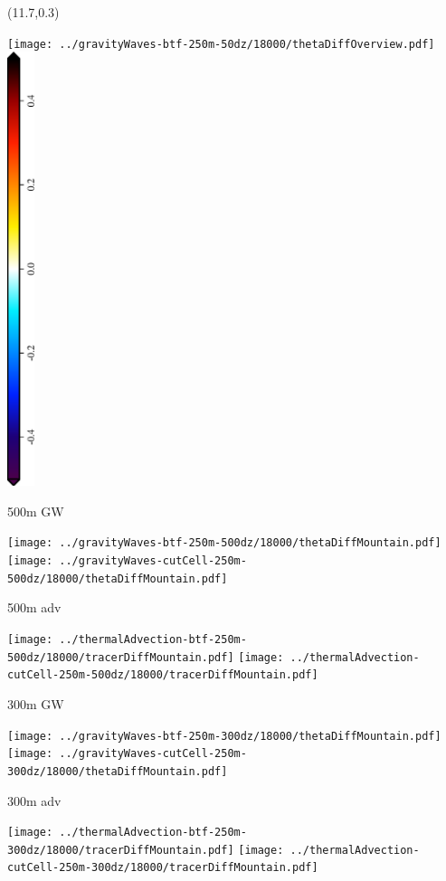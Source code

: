 \documentclass{article}
\begin{document}
\TPMargin{3pt}
\begin{textblock}{0.75}(11.7,0.3)
\end{textblock}
\centering
\texttt{[image: ../gravityWaves-btf-250m-50dz/18000/thetaDiffOverview.pdf]} \\
\includegraphics[height=5in,angle=270]{thetaDiffOverview_theta_diff.eps}

\newpage
500m GW

\texttt{[image: ../gravityWaves-btf-250m-500dz/18000/thetaDiffMountain.pdf]}
\texttt{[image: ../gravityWaves-cutCell-250m-500dz/18000/thetaDiffMountain.pdf]}

500m adv

\texttt{[image: ../thermalAdvection-btf-250m-500dz/18000/tracerDiffMountain.pdf]}
\texttt{[image: ../thermalAdvection-cutCell-250m-500dz/18000/tracerDiffMountain.pdf]}

\newpage
300m GW

\texttt{[image: ../gravityWaves-btf-250m-300dz/18000/thetaDiffMountain.pdf]}
\texttt{[image: ../gravityWaves-cutCell-250m-300dz/18000/thetaDiffMountain.pdf]}

300m adv

\texttt{[image: ../thermalAdvection-btf-250m-300dz/18000/tracerDiffMountain.pdf]}
\texttt{[image: ../thermalAdvection-cutCell-250m-300dz/18000/tracerDiffMountain.pdf]}
\end{document}
